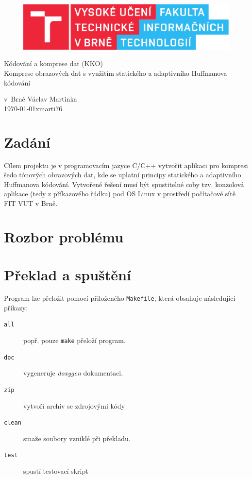 \documentclass[11pt,a4paper,onecolumn,notitlepage]{article}
\begin{document}
	\begin{center}
		\begin{figure}[hb]
			\centering
			\includegraphics{FIT.pdf}
		\end{figure}
	\LARGE
	Kódování a komprese dat (KKO)\\
	\Huge
		Komprese obrazových dat s využitím statického a adaptivního Huffmanova kódování\\
	\end{center}

{\Large v~Brně \hfill Václav Martinka\\
	\today \hfill xmarti76}


\newpage




\section{Zadání}
	Cílem projektu je v programovacím jazyce C/C++ vytvořit aplikaci pro kompresi šedo tónových 	obrazových dat, kde se uplatní principy statického a adaptivního Huffmanova kódování. Vytvořené řešení musí být spustitelné coby tzv. konzolová aplikace (tedy z příkazového řádku) pod OS Linux v prostředí počítačové sítě FIT VUT v Brně.
	
\section{Rozbor problému}


\section{Překlad a spuštění}
	Program lze přeložit pomocí přiloženého \texttt{Makefile}, která obsahuje následující příkazy:
	\begin{description}
		\item[\texttt{all}] popř. pouze \texttt{make} přeloží program.
		\item[\texttt{doc}] vygeneruje \emph{doxygen} dokumentaci.
		\item[\texttt{zip}] vytvoří archiv se zdrojovými kódy
		\item[\texttt{clean}] smaže soubory vzniklé při překladu.
		\item[\texttt{test}] spustí testovací skript
	\end{description}
	
\end{document}
